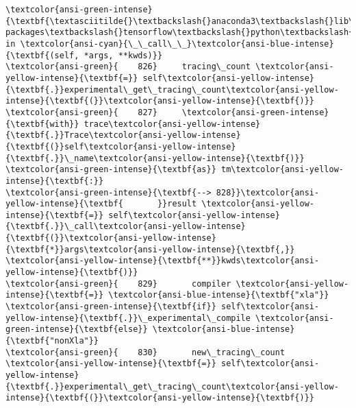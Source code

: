 \documentclass[11pt]{article}
\begin{document}
\begin{Verbatim}[commandchars=\\\{\}, frame=single, framerule=2mm, rulecolor=\color{outerrorbackground}]
\textcolor{ansi-green-intense}{\textbf{\textasciitilde{}\textbackslash{}anaconda3\textbackslash{}lib\textbackslash{}site-packages\textbackslash{}tensorflow\textbackslash{}python\textbackslash{}eager\textbackslash{}def\_function.py}} in \textcolor{ansi-cyan}{\_\_call\_\_}\textcolor{ansi-blue-intense}{\textbf{(self, *args, **kwds)}}
\textcolor{ansi-green}{    826}     tracing\_count \textcolor{ansi-yellow-intense}{\textbf{=}} self\textcolor{ansi-yellow-intense}{\textbf{.}}experimental\_get\_tracing\_count\textcolor{ansi-yellow-intense}{\textbf{(}}\textcolor{ansi-yellow-intense}{\textbf{)}}
\textcolor{ansi-green}{    827}     \textcolor{ansi-green-intense}{\textbf{with}} trace\textcolor{ansi-yellow-intense}{\textbf{.}}Trace\textcolor{ansi-yellow-intense}{\textbf{(}}self\textcolor{ansi-yellow-intense}{\textbf{.}}\_name\textcolor{ansi-yellow-intense}{\textbf{)}} \textcolor{ansi-green-intense}{\textbf{as}} tm\textcolor{ansi-yellow-intense}{\textbf{:}}
\textcolor{ansi-green-intense}{\textbf{--> 828}}\textcolor{ansi-yellow-intense}{\textbf{       }}result \textcolor{ansi-yellow-intense}{\textbf{=}} self\textcolor{ansi-yellow-intense}{\textbf{.}}\_call\textcolor{ansi-yellow-intense}{\textbf{(}}\textcolor{ansi-yellow-intense}{\textbf{*}}args\textcolor{ansi-yellow-intense}{\textbf{,}} \textcolor{ansi-yellow-intense}{\textbf{**}}kwds\textcolor{ansi-yellow-intense}{\textbf{)}}
\textcolor{ansi-green}{    829}       compiler \textcolor{ansi-yellow-intense}{\textbf{=}} \textcolor{ansi-blue-intense}{\textbf{"xla"}} \textcolor{ansi-green-intense}{\textbf{if}} self\textcolor{ansi-yellow-intense}{\textbf{.}}\_experimental\_compile \textcolor{ansi-green-intense}{\textbf{else}} \textcolor{ansi-blue-intense}{\textbf{"nonXla"}}
\textcolor{ansi-green}{    830}       new\_tracing\_count \textcolor{ansi-yellow-intense}{\textbf{=}} self\textcolor{ansi-yellow-intense}{\textbf{.}}experimental\_get\_tracing\_count\textcolor{ansi-yellow-intense}{\textbf{(}}\textcolor{ansi-yellow-intense}{\textbf{)}}


\end{Verbatim}
\end{document}
